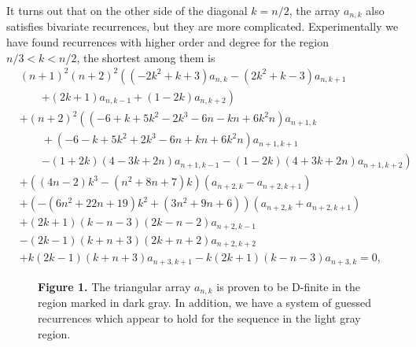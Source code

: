 \documentclass[a4paper,draft]{amsart}
\begin{document}
It turns out that on the other side of the diagonal $k=n/2$, the array $a_{n,k}$ also satisfies bivariate recurrences, but they are more complicated. Experimentally we have found recurrences with higher order and degree for the region $n/3<k<n/2$, the shortest among them is
\begin{align*}
    &(n+1)^2(n+2)^2\left(\left(-2 k^2+k+3\right) a_{n,k}-\left(2 k^2+k-3\right) a_{n,k+1}\right.\\
    &\qquad\left.+(2 k+1) a_{n,k-1}+(1-2 k) a_{n,k+2}\right)\\
    &+(n+2)^2\left((-6+k+5k^2-2k^3-6n-kn+6k^2n)a_{n+1,k}\right.\\
    &\qquad+(-6-k+5k^2+2k^3-6n+kn+6k^2n)a_{n+1,k+1}\\
    &\qquad\left. -(1+2k)(4-3k+2n)a_{n+1,k-1}-(1-2k)(4+3k+2n)a_{n+1,k+2}\right)\\
    &+\left((4n-2)k^3-(n^2+8n+7)k\right)\left(a_{n+2,k}-a_{n+2,k+1}\right)\\
    &+\left(-(6n^2+22n+19)k^2+(3n^2+9n+6)\right)\left(a_{n+2,k}+a_{n+2,k+1}\right)\\
    &+(2 k+1) (k-n-3) (2 k-n-2) a_{n+2,k-1}\\
    &-(2 k-1) (k+n+3) (2 k+n+2) a_{n+2,k+2}\\
    &+k (2 k-1) (k+n+3) a_{n+3,k+1}-k (2 k+1) (k-n-3) a_{n+3,k}=0,
\end{align*}
\begin{figure}
  \begin{center}
  \hfil
  \parbox[b]{.3\hsize}{\raggedright\small
    \textbf{Figure 1.}
    The triangular array $a_{n,k}$ is proven to be D-finite in the region
    marked in dark gray.
    In addition, we have a system of guessed recurrences which appear to
    hold for the sequence in the light gray region.

    \bigskip
    }
  \end{center}  
\end{figure}
\end{document}
